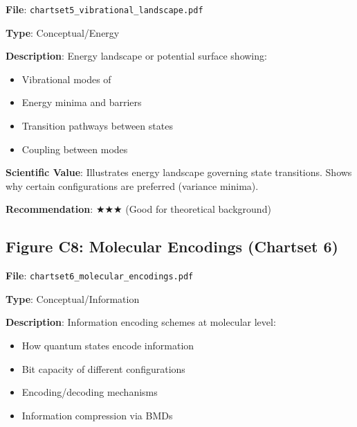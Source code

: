 \documentclass[11pt]{article}
\begin{document}
\textbf{File}: \texttt{chartset5\_vibrational\_landscape.pdf}

\textbf{Type}: Conceptual/Energy

\textbf{Description}:
Energy landscape or potential surface showing:
\begin{itemize}
\item Vibrational modes of 
\item Energy minima and barriers
\item Transition pathways between states
\item Coupling between modes
\end{itemize}

\textbf{Scientific Value}:
Illustrates energy landscape governing state transitions. Shows why certain configurations are preferred (variance minima).

\textbf{Recommendation}: $\bigstar\bigstar\bigstar$ (Good for theoretical background)

\subsection{Figure C8: Molecular Encodings (Chartset 6)}


\textbf{File}: \texttt{chartset6\_molecular\_encodings.pdf}

\textbf{Type}: Conceptual/Information

\textbf{Description}:
Information encoding schemes at molecular level:
\begin{itemize}
\item How quantum states encode information
\item Bit capacity of different configurations
\item Encoding/decoding mechanisms
\item Information compression via BMDs
\end{itemize}
\end{document}
